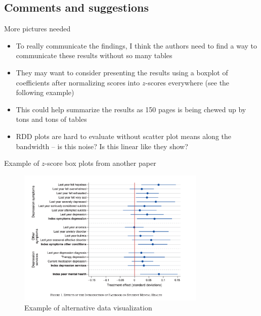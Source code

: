 \documentclass{beamer}
\begin{document}
\subsection{Comments and suggestions}

\begin{frame}{More pictures needed}

\begin{itemize}
\item To really communicate the findings, I think the authors need to find a way to communicate these results without so many tables
\item They may want to consider presenting the results using a boxplot of coefficients after normalizing scores into $z$-scores everywhere (see the following example)
\item This could help summarize the results as 150 pages is being chewed up by tons and tons of tables
\item RDD plots are hard to evaluate without scatter plot means along the bandwidth -- is this noise? Is this linear like they show?

\end{itemize}

\end{frame}

\begin{frame}{Example of $z$-score box plots from another paper}
    \begin{figure}
        \centering
        \includegraphics[width=0.8\textwidth]{./lecture_includes/facebook_2.png}
        \caption{Example of alternative data visualization}
    \end{figure}
\end{frame}
\end{document}
